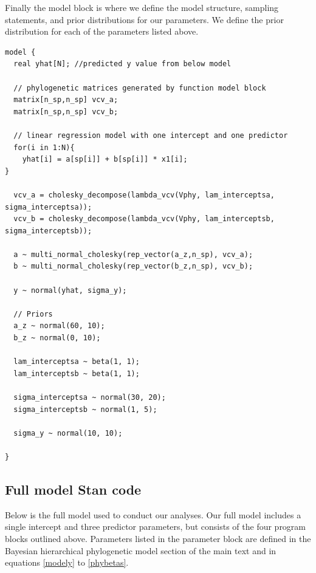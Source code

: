 \documentclass[11pt]{article}
\begin{document}
Finally the model block is where we define the model structure, sampling statements, and prior distributions for our parameters. We define the prior distribution for each of the parameters listed above.\\

\begin{verbatim}
model {
  real yhat[N]; //predicted y value from below model
       
  // phylogenetic matrices generated by function model block
  matrix[n_sp,n_sp] vcv_a;     
  matrix[n_sp,n_sp] vcv_b;    
  
  // linear regression model with one intercept and one predictor
  for(i in 1:N){
    yhat[i] = a[sp[i]] + b[sp[i]] * x1[i];
}
			     	
  vcv_a = cholesky_decompose(lambda_vcv(Vphy, lam_interceptsa, sigma_interceptsa));
  vcv_b = cholesky_decompose(lambda_vcv(Vphy, lam_interceptsb, sigma_interceptsb));
 
  a ~ multi_normal_cholesky(rep_vector(a_z,n_sp), vcv_a); 
  b ~ multi_normal_cholesky(rep_vector(b_z,n_sp), vcv_b); 
  
  y ~ normal(yhat, sigma_y);

  // Priors 
  a_z ~ normal(60, 10); 
  b_z ~ normal(0, 10);  
  
  lam_interceptsa ~ beta(1, 1);
  lam_interceptsb ~ beta(1, 1);
  
  sigma_interceptsa ~ normal(30, 20);
  sigma_interceptsb ~ normal(1, 5);
   
  sigma_y ~ normal(10, 10);
  
}
\end{verbatim}

\subsection*{Full model Stan code}
Below is the full model used to conduct our analyses. Our full model includes a single intercept and three predictor parameters, but consists of the four program blocks outlined above. Parameters listed in the parameter block are defined in the Bayesian hierarchical phylogenetic model section of the main text and in equations \ref{modely} to \ref{phybetas}.
\end{document}
